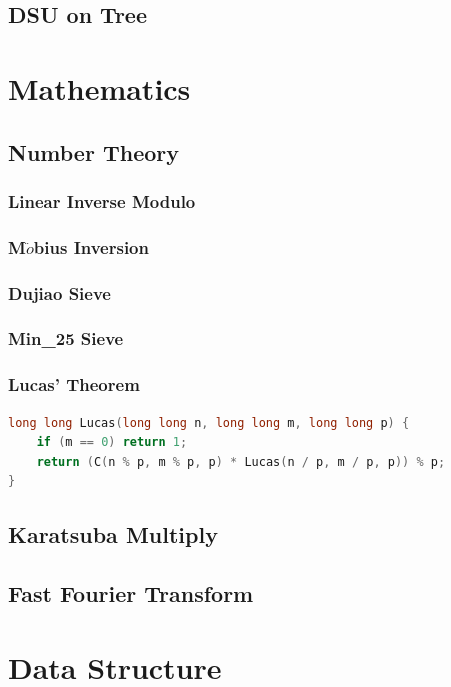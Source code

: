 \documentclass[10pt,UTF8,a4paper,twoside]{ctexart}
\begin{document}
\begin{multicols}{2}
	\subsection{DSU on Tree}
\clearpage

\section{Mathematics}
	\subsection{Number Theory}
		\subsubsection{Linear Inverse Modulo}
			
		\subsubsection{M$\ddot{o}$bius Inversion}
		\subsubsection{Dujiao Sieve}
		\subsubsection{Min\_25 Sieve}
		\subsubsection{Lucas' Theorem}
			\begin{lstlisting}[language=C++]
long long Lucas(long long n, long long m, long long p) {
	if (m == 0) return 1;
	return (C(n % p, m % p, p) * Lucas(n / p, m / p, p)) % p;
}
			\end{lstlisting}
	\subsection{Karatsuba Multiply}
		
	\subsection{Fast Fourier Transform}
		
\clearpage

\section{Data Structure}

\end{multicols}
\end{document}
